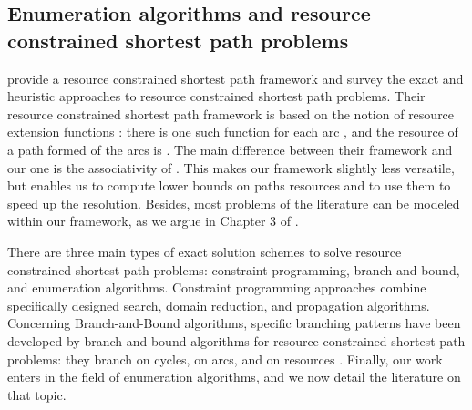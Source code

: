 \documentclass[11pt]{amsart}
\theoremstyle{plain}
\theoremstyle{remark}
\begin{document}
\subsection{Enumeration algorithms and resource constrained shortest path problems} \label{sub:enumeration_algorithms_and_resource_constrained_shortest_path_problems}

\citet{irnich2005shortest} provide a resource constrained shortest path framework and survey the exact and heuristic approaches to resource constrained shortest path problems. Their resource constrained shortest path framework is based on the notion of resource extension functions \cite{irnich2008resource}: there is one such function  for each arc , and the resource of a path formed of the arcs  is . The main difference between their framework and our one is the associativity of . This makes our framework slightly less versatile, but enables us to compute lower bounds on paths resources and to use them to speed up the resolution. Besides, most problems of the literature can be modeled within our framework, as we argue in Chapter 3 of \cite{parmentier2016thesis}.


There are three main types of exact solution schemes to solve resource constrained shortest path problems: constraint programming, branch and bound, and enumeration algorithms. Constraint programming approaches \cite{rousseau2004solving,fahle2002constraint,gualandi2009constraint,de2001combining,junker1999framework} combine specifically designed search, domain reduction, and propagation algorithms. Concerning Branch-and-Bound algorithms, specific branching patterns have been developed by branch and bound algorithms for resource constrained shortest path problems: they branch on cycles, on arcs, and on resources \cite{irnich2008resource,righini2009decremental,beasley1989algorithm,borndorfer2001scheduling}. Finally, our work enters in the field of enumeration algorithms, and we now detail the literature on that topic.
\end{document}
